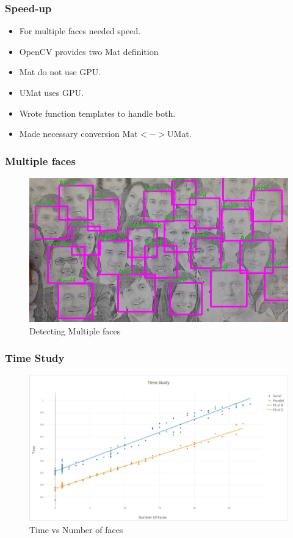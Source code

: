 \documentclass[aspectratio=149]{beamer}
\begin{document}

\begin{frame}
\frametitle{Speed-up}
\begin{itemize}
	\item For multiple faces needed speed.
	\item OpenCV provides two Mat definition
	\item Mat do not use GPU.
	\item UMat uses GPU.
	\item Wrote function templates to handle both.
	\item Made necessary conversion Mat$<->$UMat.
\end{itemize}
\end{frame}


\begin{frame}
\frametitle{Multiple faces}
\begin{figure}
	\centering
	\includegraphics[scale=0.4]{./images/mul.jpg}
	\caption{Detecting Multiple faces}
\end{figure}
\end{frame}


\begin{frame}
\frametitle{Time Study}
\begin{figure}
	\centering
	\includegraphics[scale=0.4]{./images/plot.pdf}
	\caption{Time vs Number of faces}
\end{figure}
\end{frame}
\end{document}
